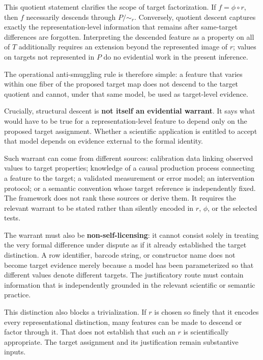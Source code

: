 \documentclass[11pt]{article}
\begin{document}
This quotient statement clarifies the scope of target factorization. If \(f=\phi\circ r\), then \(f\) necessarily descends through \(P/{\sim_r}\). Conversely, quotient descent captures exactly the representation-level information that remains after same-target differences are forgotten. Interpreting the descended feature as a property on all of \(T\) additionally requires an extension beyond the represented image of \(r\); values on targets not represented in \(P\) do no evidential work in the present inference.

The operational anti-smuggling rule is therefore simple: a feature that varies within one fiber of the proposed target map does not descend to the target quotient and cannot, under that same model, be used as target-level evidence.

Crucially, structural descent is \textbf{not itself an evidential warrant}. It says what would have to be true for a representation-level feature to depend only on the proposed target assignment. Whether a scientific application is entitled to accept that model depends on evidence external to the formal identity.

Such warrant can come from different sources: calibration data linking observed values to target properties; knowledge of a causal production process connecting a feature to the target; a validated measurement or error model; an intervention protocol; or a semantic convention whose target reference is independently fixed. The framework does not rank these sources or derive them. It requires the relevant warrant to be stated rather than silently encoded in \(r\), \(\phi\), or the selected tests.

The warrant must also be \textbf{non-self-licensing}: it cannot consist solely in treating the very formal difference under dispute as if it already established the target distinction. A row identifier, barcode string, or constructor name does not become target evidence merely because a model has been parameterized so that different values denote different targets. The justificatory route must contain information that is independently grounded in the relevant scientific or semantic practice.

This distinction also blocks a trivialization. If \(r\) is chosen so finely that it encodes every representational distinction, many features can be made to descend or factor through it. That does not establish that such an \(r\) is scientifically appropriate. The target assignment and its justification remain substantive inputs.
\end{document}
